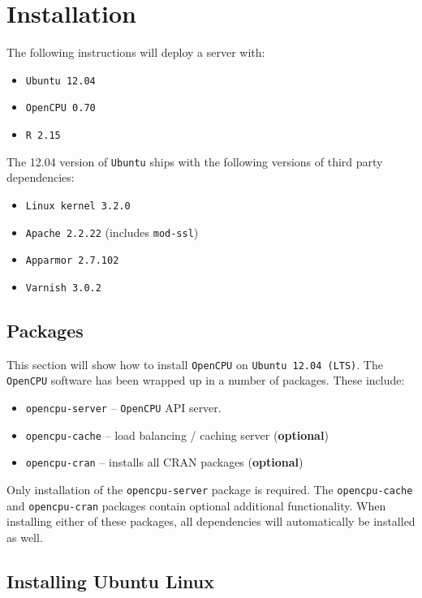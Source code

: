 \documentclass{scrartcl}
\begin{document}
\newpage 

\section{Installation}

The following instructions will deploy a server with:

\begin{itemize}
  \item \texttt{Ubuntu 12.04}
  \item \texttt{OpenCPU 0.70}
  \item \texttt{R 2.15}
\end{itemize}

\noindent The 12.04 version of \texttt{Ubuntu} ships with the following
versions of third party dependencies:

\begin{itemize}
  \item \texttt{Linux kernel 3.2.0}
  \item \texttt{Apache 2.2.22} (includes \texttt{mod-ssl})
  \item \texttt{Apparmor 2.7.102}
  \item \texttt{Varnish 3.0.2}
\end{itemize}

\subsection{Packages}


This section will show how to install \texttt{OpenCPU} on \texttt{Ubuntu 12.04
(LTS)}. The \texttt{OpenCPU} software has been wrapped up in a number of
packages. These include:
\begin{itemize}
  \item \texttt{opencpu-server} -- \texttt{OpenCPU} API server.
  \item \texttt{opencpu-cache} -- load balancing / caching server
  (\textbf{optional})
  \item \texttt{opencpu-cran} -- installs all CRAN packages (\textbf{optional})
\end{itemize}
Only installation of the \texttt{opencpu-server} package is required. The
\texttt{opencpu-cache} and \texttt{opencpu-cran} packages contain optional
additional functionality. When installing either of these packages, all
dependencies will automatically be installed as well.

\subsection{Installing Ubuntu Linux}
\end{document}
